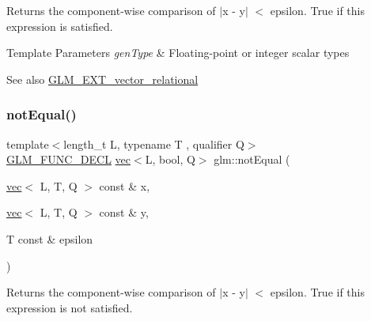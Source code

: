 Returns the component-\/wise comparison of $\vert$x -\/ y$\vert$ $<$ epsilon. True if this expression is satisfied.


\begin{DoxyTemplParams}{Template Parameters}
{\em gen\+Type} & Floating-\/point or integer scalar types\\
\hline
\end{DoxyTemplParams}
\begin{DoxySeeAlso}{See also}
\mbox{\hyperlink{group__ext__vector__relational}{G\+L\+M\+\_\+\+E\+X\+T\+\_\+vector\+\_\+relational}} 
\end{DoxySeeAlso}
\mbox{\label{group__ext__vector__relational_ga59a03a51402b6e1ce80f9a3b436f17bd}} 
\subsubsection{\texorpdfstring{not\+Equal()}{notEqual()}\hspace{0.1cm}{\footnotesize\ttfamily [1/3]}}
{\footnotesize\ttfamily template$<$length\+\_\+t L, typename T , qualifier Q$>$ \\
\mbox{\hyperlink{setup_8hpp_ab2d052de21a70539923e9bcbf6e83a51}{G\+L\+M\+\_\+\+F\+U\+N\+C\+\_\+\+D\+E\+CL}} \mbox{\hyperlink{structglm_1_1vec}{vec}}$<$L, bool, Q$>$ glm\+::not\+Equal (\begin{DoxyParamCaption}\item[{\mbox{\hyperlink{structglm_1_1vec}{vec}}$<$ L, T, Q $>$ const \&}]{x,  }\item[{\mbox{\hyperlink{structglm_1_1vec}{vec}}$<$ L, T, Q $>$ const \&}]{y,  }\item[{T const \&}]{epsilon }\end{DoxyParamCaption})}

Returns the component-\/wise comparison of $\vert$x -\/ y$\vert$ $<$ epsilon. True if this expression is not satisfied.


